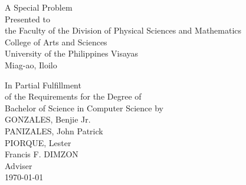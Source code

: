 \begin{titlepage}
\centering


\vspace{0.875cm}
A Special Problem\\
Presented to\\
the Faculty of the Division of Physical Sciences and Mathematics\\
College of Arts and Sciences\\
University of the Philippines Visayas\\
Miag-ao, Iloilo

\vspace{0.875cm}
In Partial Fulfillment\\
of the Requirements for the Degree of\\
Bachelor of Science in Computer Science
\vspace{1.75cm}
by\\

\vspace{0.1cm}
GONZALES, Benjie Jr.  \\
PANIZALES, John Patrick  \\
PIORQUE, Lester  \\

\vspace{0.875cm}
Francis F. DIMZON \\
Adviser\\

\vspace{0.875cm}
\today
\end{titlepage}
